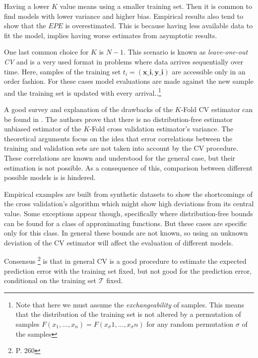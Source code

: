 Having a lower $K$ value means using a smaller training set. Then it is common to find models with lower variance and higher bias. Empirical results also tend to show that the $EPE$ is overestimated. This is because having less available data to fit the model, implies having worse estimates from asymptotic results.
 
One last common choice for $K$ is $N-1$. This scenario is known as \textit{leave-one-out CV} and is a very used format in problems where data arrives sequentially over time. Here, samples of the training set $t_i = (\textbf{x_i},\textbf{y_i})$ are accessible only in an order fashion. For these cases model evaluations are made against the new sample and the training set is updated with every arrival..\footnote{Note that here we must assume the \textit{exchangeability} of samples. This means that the distribution of the training set is not altered by a permutation of samples $F(x_1,...,x_n ) = F(x_\sigma{1},...,x_\sigma{n})$ for any random permutation $\sigma$ of the samples  }
 

A good survey and explanation of the drawbacks of the $K$-Fold CV estimator can be found in \cite{bengio-unbiasedCvEstimator}. The authors prove that there is no distribution-free estimator unbiased estimator of the $K$-Fold cross validation estimator's variance. The theoretical arguments focus on the idea that error correlations between the training and validation sets are not taken into account by the CV procedure. These correlations are known and understood for the general case, but their estimation is not possible. As a consequence of this, comparison between different possible models is is hindered. 

Empirical examples are built from synthetic datasets to show the shortcomings of the cross validation's algorithm which might show high deviations from its central value. Some exceptions appear though, specifically where distribution-free bounds can be found for a class of approximating functions. But these cases are specific only for this class. In general these bounds are not known, so using an unknown deviation of the CV estimator will affect the evaluation of different models.

Consensus \footnote{\cite{hastie-elemstatslearn} P. 260} is that in general CV is a good procedure to estimate the expected prediction error with the training set fixed, but not good for the prediction error, conditional on the training set $\mathcal{T}$ fixed.

